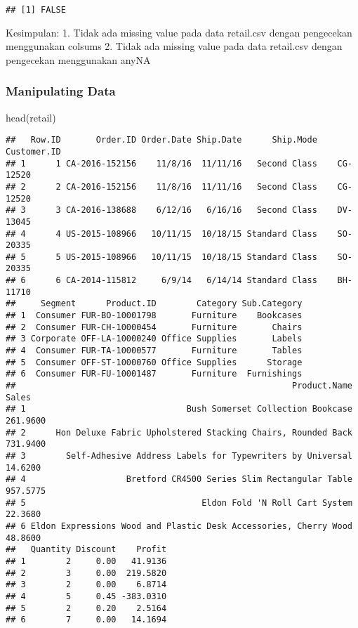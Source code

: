 \documentclass[
]{article}
\newenvironment{Shaded}{\begin{snugshade}}{\end{snugshade}}
\newcommand{\FunctionTok}[1]{\textcolor[rgb]{0.00,0.00,0.00}{#1}}
\newcommand{\NormalTok}[1]{#1}
\begin{document}
\begin{verbatim}
## [1] FALSE
\end{verbatim}

Kesimpulan: 1. Tidak ada missing value pada data retail.csv dengan
pengecekan menggunakan colsums 2. Tidak ada missing value pada data
retail.csv dengan pengecekan menggunakan anyNA

\hypertarget{manipulating-data}{%
\subsubsection{Manipulating Data}\label{manipulating-data}}

\begin{Shaded}
\begin{Highlighting}[]
\FunctionTok{head}\NormalTok{(retail)}
\end{Highlighting}
\end{Shaded}

\begin{verbatim}
##   Row.ID       Order.ID Order.Date Ship.Date      Ship.Mode Customer.ID
## 1      1 CA-2016-152156    11/8/16  11/11/16   Second Class    CG-12520
## 2      2 CA-2016-152156    11/8/16  11/11/16   Second Class    CG-12520
## 3      3 CA-2016-138688    6/12/16   6/16/16   Second Class    DV-13045
## 4      4 US-2015-108966   10/11/15  10/18/15 Standard Class    SO-20335
## 5      5 US-2015-108966   10/11/15  10/18/15 Standard Class    SO-20335
## 6      6 CA-2014-115812     6/9/14   6/14/14 Standard Class    BH-11710
##     Segment      Product.ID        Category Sub.Category
## 1  Consumer FUR-BO-10001798       Furniture    Bookcases
## 2  Consumer FUR-CH-10000454       Furniture       Chairs
## 3 Corporate OFF-LA-10000240 Office Supplies       Labels
## 4  Consumer FUR-TA-10000577       Furniture       Tables
## 5  Consumer OFF-ST-10000760 Office Supplies      Storage
## 6  Consumer FUR-FU-10001487       Furniture  Furnishings
##                                                       Product.Name    Sales
## 1                                Bush Somerset Collection Bookcase 261.9600
## 2      Hon Deluxe Fabric Upholstered Stacking Chairs, Rounded Back 731.9400
## 3        Self-Adhesive Address Labels for Typewriters by Universal  14.6200
## 4                    Bretford CR4500 Series Slim Rectangular Table 957.5775
## 5                                   Eldon Fold 'N Roll Cart System  22.3680
## 6 Eldon Expressions Wood and Plastic Desk Accessories, Cherry Wood  48.8600
##   Quantity Discount    Profit
## 1        2     0.00   41.9136
## 2        3     0.00  219.5820
## 3        2     0.00    6.8714
## 4        5     0.45 -383.0310
## 5        2     0.20    2.5164
## 6        7     0.00   14.1694
\end{verbatim}
\end{document}
